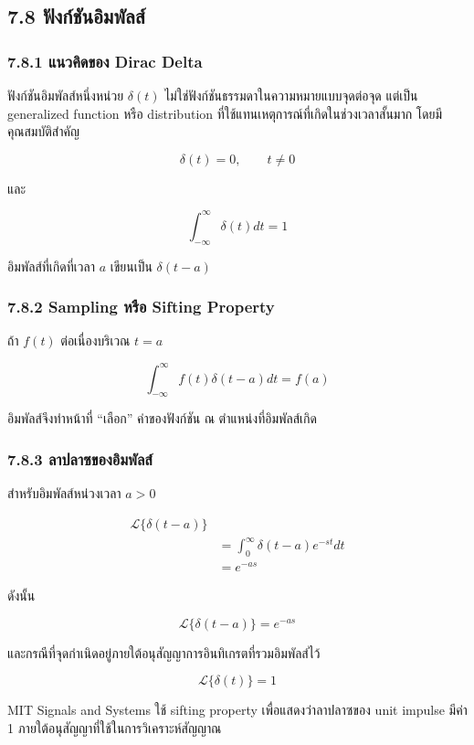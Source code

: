 \subsection{7.8 ฟังก์ชันอิมพัลส์}

\subsubsection{7.8.1 แนวคิดของ Dirac Delta}

ฟังก์ชันอิมพัลส์หนึ่งหน่วย $\delta(t)$ ไม่ใช่ฟังก์ชันธรรมดาในความหมายแบบจุดต่อจุด แต่เป็น generalized function หรือ distribution ที่ใช้แทนเหตุการณ์ที่เกิดในช่วงเวลาสั้นมาก โดยมีคุณสมบัติสำคัญ

\[
\delta(t)=0,\qquad t\ne 0
\]

และ

\[
\boxed{\int_{-\infty}^{\infty}\delta(t)dt=1}
\]

อิมพัลส์ที่เกิดที่เวลา $a$ เขียนเป็น $\delta(t-a)$

\subsubsection{7.8.2 Sampling หรือ Sifting Property}

ถ้า $f(t)$ ต่อเนื่องบริเวณ $t=a$

\[
\boxed{\int_{-\infty}^{\infty}f(t)\delta(t-a)dt=f(a)}
\]

อิมพัลส์จึงทำหน้าที่ “เลือก” ค่าของฟังก์ชัน ณ ตำแหน่งที่อิมพัลส์เกิด

\subsubsection{7.8.3 ลาปลาซของอิมพัลส์}

สำหรับอิมพัลส์หน่วงเวลา $a>0$

\[
\begin{aligned}
    \mathcal{L}\{\delta(t-a)\}&\\
    &=\int_0^{\infty}\delta(t-a)e^{-st}dt\\
    &=e^{-as}
\end{aligned}
\]

ดังนั้น

\[
\boxed{\mathcal{L}\{\delta(t-a)\}=e^{-as}}
\]

และกรณีที่จุดกำเนิดอยู่ภายใต้อนุสัญญาการอินทิเกรตที่รวมอิมพัลส์ไว้

\[
\boxed{\mathcal{L}\{\delta(t)\}=1}
\]

MIT Signals and Systems ใช้ sifting property เพื่อแสดงว่าลาปลาซของ unit impulse มีค่า 1 ภายใต้อนุสัญญาที่ใช้ในการวิเคราะห์สัญญาณ

